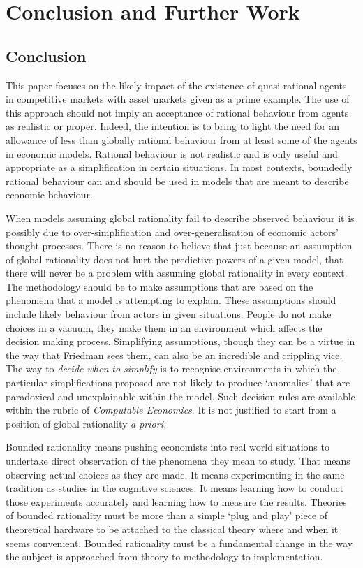 \documentclass{ucthesis}
\begin{document}
\chapter{Conclusion and Further Work}

\section{Conclusion}

This paper focuses on the likely impact of the existence of quasi-rational
agents in competitive markets with asset markets given as a prime example.
The use of this approach should not imply an acceptance of rational
behaviour from agents as realistic or proper. Indeed, the intention is to
bring to light the need for an allowance of less than globally rational
behaviour from at least some of the agents in economic models. Rational
behaviour is not realistic and is only useful and appropriate as a
simplification in certain situations. In most contexts, boundedly rational
behaviour can and should be used in models that are meant to describe
economic behaviour.

When models assuming global rationality fail to describe observed behaviour
it is possibly due to over-simplification and over-generalisation of
economic actors' thought processes. There is no reason to believe that just
because an assumption of global rationality does not hurt the predictive
powers of a given model, that there will never be a problem with assuming
global rationality in every context. The methodology should be to make
assumptions that are based on the phenomena that a model is attempting to
explain. These assumptions should include likely behaviour from actors in
given situations. People do not make choices in a vacuum, they make them in
an environment which affects the decision making process. Simplifying
assumptions, though they can be a virtue in the way that Friedman sees them,
can also be an incredible and crippling vice. The way to \textit{decide when
to simplify} is to recognise environments in which the particular
simplifications proposed are not likely to produce `anomalies' that are
paradoxical and unexplainable within the model. Such decision rules are
available within the rubric of \textit{Computable Economics}. It is not
justified to start from a position of global rationality \textit{a priori.}

Bounded rationality means pushing economists into real world situations to
undertake direct observation of the phenomena they mean to study. That means
observing actual choices as they are made. It means experimenting in the
same tradition as studies in the cognitive sciences. It means learning how
to conduct those experiments accurately and learning how to measure the
results. Theories of bounded rationality must be more than a simple `plug
and play' piece of theoretical hardware to be attached to the classical
theory where and when it seems convenient. Bounded rationality must be a
fundamental change in the way the subject is approached from theory to
methodology to implementation.
\end{document}
